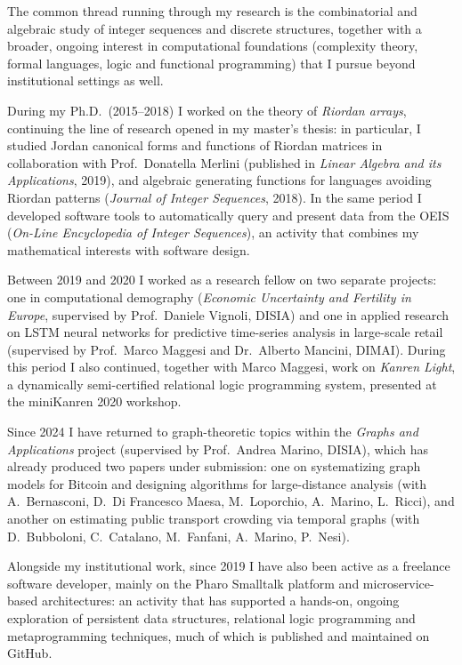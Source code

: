 \documentclass[11pt,a4paper]{article}
\begin{document}
The common thread running through my research is the combinatorial and algebraic study of integer sequences and discrete structures, together with a broader, ongoing interest in computational foundations (complexity theory, formal languages, logic and functional programming) that I pursue beyond institutional settings as well.

During my Ph.D.\ (2015--2018) I worked on the theory of \emph{Riordan arrays}, continuing the line of research opened in my master's thesis: in particular, I studied Jordan canonical forms and functions of Riordan matrices in collaboration with Prof.\ Donatella Merlini (published in \emph{Linear Algebra and its Applications}, 2019), and algebraic generating functions for languages avoiding Riordan patterns (\emph{Journal of Integer Sequences}, 2018). In the same period I developed software tools to automatically query and present data from the OEIS (\emph{On-Line Encyclopedia of Integer Sequences}), an activity that combines my mathematical interests with software design.

Between 2019 and 2020 I worked as a research fellow on two separate projects: one in computational demography (\emph{Economic Uncertainty and Fertility in Europe}, supervised by Prof.\ Daniele Vignoli, DISIA) and one in applied research on LSTM neural networks for predictive time-series analysis in large-scale retail (supervised by Prof.\ Marco Maggesi and Dr.\ Alberto Mancini, DIMAI). During this period I also continued, together with Marco Maggesi, work on \emph{Kanren Light}, a dynamically semi-certified relational logic programming system, presented at the miniKanren 2020 workshop.

Since 2024 I have returned to graph-theoretic topics within the \emph{Graphs and Applications} project (supervised by Prof.\ Andrea Marino, DISIA), which has already produced two papers under submission: one on systematizing graph models for Bitcoin and designing algorithms for large-distance analysis (with A.\ Bernasconi, D.\ Di Francesco Maesa, M.\ Loporchio, A.\ Marino, L.\ Ricci), and another on estimating public transport crowding via temporal graphs (with D.\ Bubboloni, C.\ Catalano, M.\ Fanfani, A.\ Marino, P.\ Nesi).

Alongside my institutional work, since 2019 I have also been active as a freelance software developer, mainly on the Pharo Smalltalk platform and microservice-based architectures: an activity that has supported a hands-on, ongoing exploration of persistent data structures, relational logic programming and metaprogramming techniques, much of which is published and maintained on GitHub.
\end{document}
